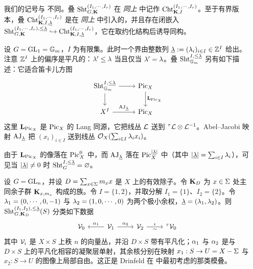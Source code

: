 \begin{rmk} 我们的记号与 \cite[定义 2.1]{VLaff} 不同。叠 $\textup{Sht}^{(I_{1},\cdots, I_{r})}_{G,\mathbf{K}}$ 在 {\em 同上} 中记作 $\textup{Cht}_{\mathbf{K},I}^{(I_{1},\cdots, I_{r})}$。至于有界版本，叠 $\textup{Cht}_{\mathbf{K},I, \underline{\lambda}}^{(I_{1},\cdots, I_{r})}$ 是在 {\em 同上} 中引入的，并且存在闭嵌入 $\textup{Sht}^{(I_{1},\cdots, I_{r}), \le \underline{\lambda}}_{G,\mathbf{K}}\hookrightarrow \textup{Cht}_{\mathbf{K},I, \underline{\lambda}}^{(I_{1},\cdots, I_{r})}$，它在取约化结构后诱导同构。
\end{rmk}


\begin{exam}\label{ex:Gm} 设 $G=\textup{GL}_{1}=\mathbb{G}_m$，$I$ 为有限集。此时一个界由整数列 $\underline{\lambda}:=(\lambda_{i})_{i\in I}\in \mathbb{Z}^{I}$ 给出。注意 $\mathbb{Z}^{I}$ 上的偏序是平凡的：$\lambda'\le \lambda$ 当且仅当 $\lambda'=\lambda$。叠 $\textup{Sht}^{I, \le \underline{\lambda}}_{\mathbb{G}_m}$ 另有如下描述：它适合笛卡儿方图
\begin{equation*}
\begin{tikzcd}
\Sht^{I, \le \un\l}_{\Gm} \arrow[r]\arrow[d] & \Pic_{X}\arrow[d, "\bL_{\Pic_{X}}"] \\
X^{I}\arrow[r, "\AJ_{\un\l}"] & \Pic_{X}
\end{tikzcd}
\end{equation*}
这里 $\mathbf{L}_{\textup{Pic}_{X}}$ 是 $\textup{Pic}_{X}$ 的 Lang 同源，它把线丛 $\mathcal{L}$ 送到 ${}^{\tau}\mathcal{L}\otimes \mathcal{L}^{-1}$。Abel–Jacobi 映射 $\textup{AJ}_{\underline{\lambda}}$ 把 $(x_{i})_{i\in I}$ 送到线丛 $\mathcal{O}_{X}(\sum_{i\in I}\lambda_{i}x_{i})$。

由于 $\mathbf{L}_{\textup{Pic}_{X}}$ 的像落在 $\textup{Pic}^{0}_{X}$ 中，而 $\textup{AJ}_{\underline{\lambda}}$ 落在 $\textup{Pic}^{|\underline{\lambda}|}_{X}$ 中（其中 $|\underline{\lambda}|=\sum_{i\in I}\lambda_{i}$），可见当 $|\underline{\lambda}|\ne0$ 时 $\textup{Sht}^{I, \le \underline{\lambda}}_{G} =\varnothing$。
\end{exam}

\begin{exam}\label{ex:Dr} 设 $G=\textup{GL}_{n}$，并设 $D=\sum_{x\in \Sigma}m_{x}x$ 是 $X$ 上的有效除子。令 $\mathbf{K}_{D}$ 为 $x\in \Sigma$ 处主同余子群 $\mathbf{K}_{x,m_{x}}$ 构成的族。令 $I=\{1,2\}$，并取分解 $I_{1}=\{1\}$、$I_{2}=\{2\}$。令 $\lambda_{1}=(0,\cdots, 0,-1)$ 与 $\lambda_{2}=(1,0,\cdots,0)$ 为两个极小余权，$\underline{\lambda}=(\lambda_{1},\lambda_{2})$。则 $\textup{Sht}^{(I_{1},I_{2}), \le\underline{\lambda}}_{G,\mathbf{K}_{D}}(S)$ 分类如下数据
\begin{equation*}
\begin{tikzcd}
\cV_{0} & \cV_{1}\arrow[l, "\a_{1}"'] \arrow[r, "\a_{2}"] & \cV_{2}\arrow[r, "\io"{above}, "{\sim}"{below}] & {}^{\t}\cV_{0}
\end{tikzcd}
\end{equation*}
其中 $\mathcal{V}_{i}$ 是 $X\times S$ 上秩 $n$ 的向量丛，并沿 $D\times S$ 带有平凡化；$\alpha_{1}$ 与 $\alpha_{2}$ 是与 $D\times S$ 上的平凡化相容的凝聚层单射，其余核分别在映射 $x_{1}: S\to U=X-\Sigma$ 与 $x_{2}: S\to U$ 的图像上局部自由。这正是 Drinfeld 在 \cite{Dr-FBun} 中最初考虑的那类模叠。
\end{exam}

